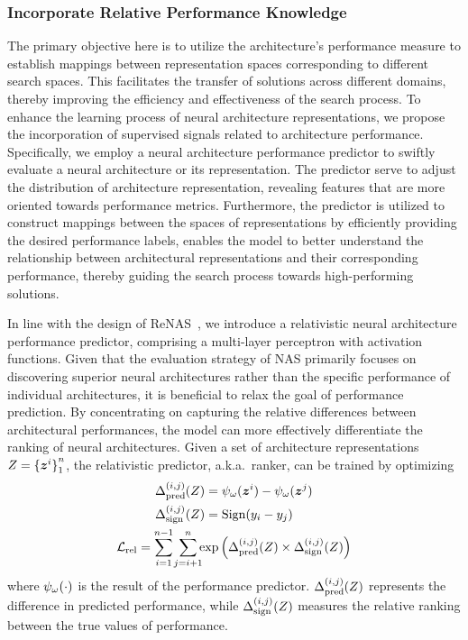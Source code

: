 \documentclass[../main.tex]{subfiles}
\begin{document}
\subsubsection{Incorporate Relative Performance Knowledge}

The primary objective here is to utilize the architecture's performance measure to establish mappings between representation spaces corresponding to different search spaces.
This facilitates the transfer of solutions across different domains, thereby improving the efficiency and effectiveness of the search process.
To enhance the learning process of neural architecture representations, we propose the incorporation of supervised signals related to architecture performance. Specifically, we employ a neural architecture performance predictor to swiftly evaluate a neural architecture or its representation.
The predictor serve to adjust the distribution of architecture representation, revealing features that are more oriented towards performance metrics. Furthermore, the predictor is utilized to construct mappings between the spaces of representations by efficiently providing the desired performance labels, enables the model to better understand the relationship between architectural representations and their corresponding performance, thereby guiding the search process towards high-performing solutions.

In line with the design of ReNAS~\cite{DBLP:conf/cvpr/Xu00TJX021}, we introduce a relativistic neural architecture performance predictor, comprising a multi-layer perceptron with activation functions.
Given that the evaluation strategy of NAS primarily focuses on discovering superior neural architectures rather than the specific performance of individual architectures, it is beneficial to relax the goal of performance prediction.
By concentrating on capturing the relative differences between architectural performances, the model can more effectively differentiate the ranking of neural architectures. Given a set of architecture representations \( Z = {\{ \bm{z}^{i} \}}_{1}^{n} \), the relativistic predictor, a.k.a.\ ranker, can be trained by optimizing
\begin{gather}
  \begin{aligned}
    \Delta_{\mathrlap{\mathrm{pred}}}^{(i,j)}(Z) & = \predModel_{\predParam}(\archLtn^i) - \predModel_{\predParam}(\archLtn^j) \\
    \Delta_{\mathrlap{\mathrm{sign}}}^{(i,j)}(Z) & = \mathrm{Sign}(y_i-y_j)
  \end{aligned} \notag \\
  \mathcal{L}_\mathrm{rel} = \sum_{\mathclap{i=1}}^{n-1}{\;\sum_{\mathclap{j=i+1}}^{n}{\exp{\left( \Delta_\mathrm{pred}^{(i,j)}(Z) \times \Delta_\mathrm{sign}^{(i,j)}(Z)\right)}}}
\end{gather}
\noindent where \( \psi_\omega(\cdot) \) is the result of the performance predictor.
\(\Delta_{\mathrlap{\mathrm{pred}}}^{(i,j)}(Z)\) represents the difference in predicted performance, while \(\Delta_{\mathrlap{\mathrm{sign}}}^{(i,j)}(Z)\) measures the relative ranking between the true values of performance.
\end{document}
